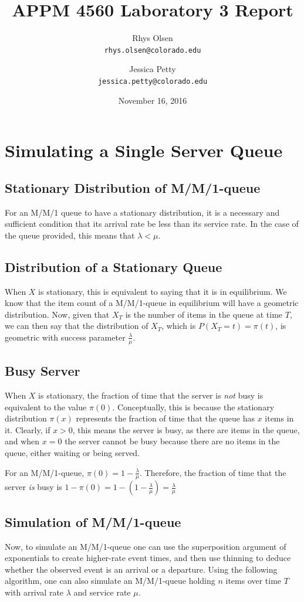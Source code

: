 \documentclass[11pt, oneside]{article}
\title{APPM 4560 Laboratory 3 Report}
\author{Rhys Olsen\\
\texttt{rhys.olsen@colorado.edu}
 \and Jessica Petty\\
 \texttt{jessica.petty@colorado.edu}
 }
\date{November 16, 2016}
\begin{document}
\maketitle
\section{Simulating a Single Server Queue}
\subsection{Stationary Distribution of M/M/1-queue}
For an M/M/1 queue to have a stationary distribution, it is a necessary and sufficient condition that its arrival rate be less than its service rate. In the case of the queue provided, this means that $\lambda < \mu$.

\subsection{Distribution of a Stationary Queue}
When $X$ is stationary, this is equivalent to saying that it is in equilibrium. We know that the item count of a M/M/1-queue in equilibrium will have a geometric distribution. Now, given that $X_T$ is the number of items in the queue at time $T$, we can then say that the distribution of $X_T$, which is $P(X_T = t) = \pi(t)$, is geometric with success parameter $\frac{\lambda}{\mu}$.

\subsection{Busy Server}
When $X$ is stationary, the fraction of time that the server is \textit{not} busy is equivalent to the value $\pi(0)$. Conceptually, this is because the stationary distribution $\pi(x)$ represents the fraction of time that the queue has $x$ items in it. Clearly, if $x > 0$, this means the server is busy, as there are items in the queue, and when $x=0$ the server cannot be busy because there are no items in the queue, either waiting or being served.

For an M/M/1-queue, $\pi(0)=1-\frac{\lambda}{\mu}$. Therefore, the fraction of time that the server \textit{is} busy is $1-\pi(0)=1-(1-\frac{\lambda}{\mu})=\frac{\lambda}{\mu}$

\subsection{Simulation of M/M/1-queue}
Now, to simulate an M/M/1-queue one can use the superposition argument of exponentials to create higher-rate event times, and then use thinning to deduce whether the observed event is an arrival or a departure. Using the following algorithm, one can also simulate an M/M/1-queue holding $n$ items over time $T$ with arrival rate $\lambda$ and service rate $\mu$.
\end{document}
